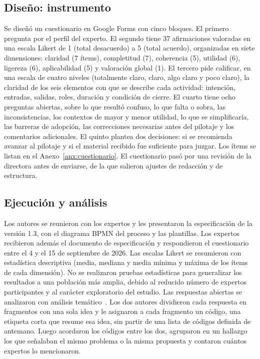 \documentclass[12pt,letterpaper,oneside]{report}
\begin{document}
\subsection{Diseño: instrumento}
Se diseñó un cuestionario en Google Forms con cinco bloques. El primero pregunta por el
perfil del experto. El segundo tiene 37 afirmaciones valoradas en una escala
Likert de 1 (total desacuerdo) a 5 (total acuerdo), organizadas en siete
dimensiones: claridad (7 ítems), completitud (7), coherencia (5), utilidad (6),
ligereza (6), aplicabilidad (5) y valoración global (1). El tercero pide
calificar, en una escala de cuatro niveles (totalmente claro, claro, algo claro
y poco claro), la claridad de los seis elementos con que se describe cada
actividad: intención, entradas, salidas, roles, duración y condición de cierre.
El cuarto tiene ocho preguntas abiertas, sobre lo que resultó confuso, lo que
falta o sobra, las inconsistencias, los contextos de mayor y menor utilidad, lo
que se simplificaría, las barreras de adopción, las correcciones necesarias
antes del pilotaje y los comentarios adicionales. El quinto plantea dos
decisiones: si se recomienda avanzar al pilotaje y si el material recibido fue
suficiente para juzgar. Los ítems se listan en el Anexo~\ref{anx:cuestionario}.
El cuestionario pasó por una revisión de la directora antes de enviarse, de la
que salieron ajustes de redacción y de estructura.

\subsection{Ejecución y análisis}
Los autores se reunieron con los expertos y les presentaron la especificación
de la versión 1.3, con el diagrama BPMN del proceso y las plantillas. Los expertos
recibieron además el documento de especificación y respondieron el cuestionario
entre el 4 y el 15 de septiembre de 2026. Las escalas Likert se
resumieron con estadística descriptiva (media, mediana y media mínima y máxima
de los ítems de cada dimensión). No se realizaron pruebas estadísticas para generalizar
los resultados a una población más amplia, debido al reducido número de expertos 
participantes y al carácter exploratorio del estudio. Las respuestas abiertas se analizaron con
análisis temático~\cite{braun2006thematic}. Los dos autores dividieron cada
respuesta en fragmentos con una sola idea y le asignaron a cada fragmento un
código, una etiqueta corta que resume esa idea, sin partir de una lista de
códigos definida de antemano. Luego acordaron los códigos entre los dos,
agruparon en un hallazgo los que señalaban el mismo problema o la misma
propuesta y contaron cuántos expertos lo mencionaron.
\end{document}
